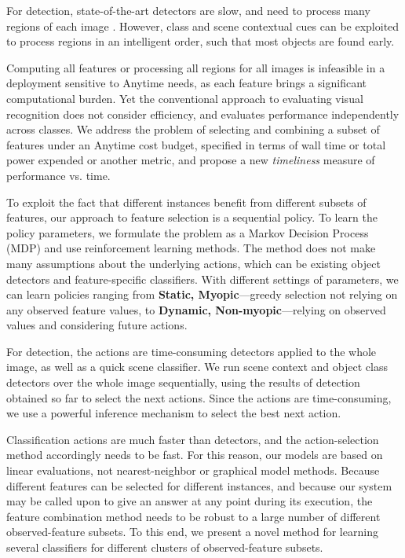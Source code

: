 For detection, state-of-the-art detectors are slow, and need to process many regions of each image \cite{Felzenszwalb2010a,Girshick-CVPR-2014}.
However, class and scene contextual cues can be exploited to process regions in an intelligent order, such that most objects are found early.

Computing all features or processing all regions for all images is infeasible in a deployment sensitive to Anytime needs, as each feature brings a significant computational burden.
Yet the conventional approach to evaluating visual recognition does not consider efficiency, and evaluates performance independently across classes.
We address the problem of selecting and combining a subset of features under an Anytime cost budget, specified in terms of wall time or total power expended or another metric, and propose a new \emph{timeliness} measure of performance vs. time.

To exploit the fact that different instances benefit from different subsets of features, our approach to feature selection is a sequential policy.
To learn the policy parameters, we formulate the problem as a Markov Decision Process (MDP) and use reinforcement learning methods.
The method does not make many assumptions about the underlying actions, which can be existing object detectors and feature-specific classifiers.
With different settings of parameters, we can learn policies ranging from \textbf{Static, Myopic}---greedy selection not relying on any observed feature values, to \textbf{Dynamic, Non-myopic}---relying on observed values and considering future actions.

For detection, the actions are time-consuming detectors applied to the whole image, as well as a quick scene classifier.
We run scene context and object class detectors over the whole image sequentially, using the results of detection obtained so far to select the next actions.
Since the actions are time-consuming, we use a powerful inference mechanism to select the best next action.

Classification actions are much faster than detectors, and the action-selection method accordingly needs to be fast.
For this reason, our models are based on linear evaluations, not nearest-neighbor or graphical model methods.
Because different features can be selected for different instances, and because our system may be called upon to give an answer at any point during its execution, the feature combination method needs to be robust to a large number of different observed-feature subsets.
To this end, we present a novel method for learning several classifiers for different clusters of observed-feature subsets.

